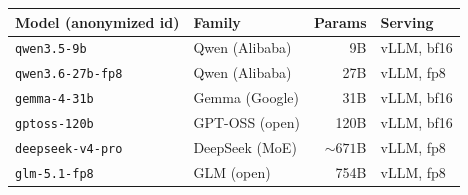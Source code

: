 \begin{tabular}{@{}l l r l@{}}
\toprule
Model (anonymized id) & Family & Params & Serving \\
\midrule
\texttt{qwen3.5-9b} & Qwen (Alibaba) & 9B & vLLM, bf16 \\
\texttt{qwen3.6-27b-fp8} & Qwen (Alibaba) & 27B & vLLM, fp8 \\
\texttt{gemma-4-31b} & Gemma (Google) & 31B & vLLM, bf16 \\
\texttt{gptoss-120b} & GPT-OSS (open) & 120B & vLLM, bf16 \\
\texttt{deepseek-v4-pro} & DeepSeek (MoE) & ${\sim}671$B & vLLM, fp8 \\
\texttt{glm-5.1-fp8} & GLM (open) & 754B & vLLM, fp8 \\
\bottomrule
\end{tabular}
